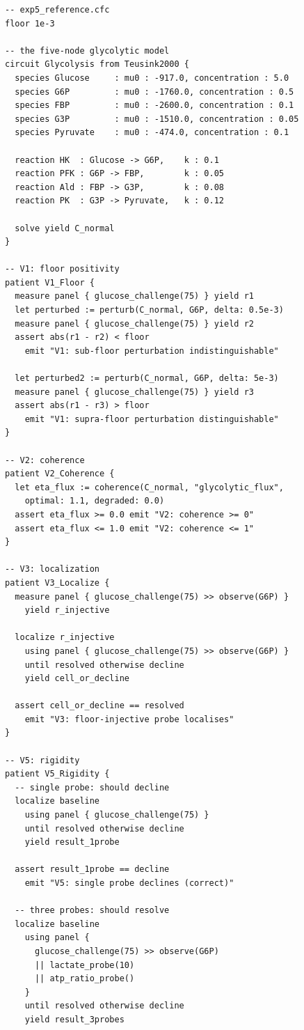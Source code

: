 \documentclass[11pt,a4paper]{article}
\theoremstyle{expthm}
\theoremstyle{definition}
\theoremstyle{remark}
\begin{document}
\begin{lstlisting}[caption={E5: CFC reference implementation.}]
-- exp5_reference.cfc
floor 1e-3

-- the five-node glycolytic model
circuit Glycolysis from Teusink2000 {
  species Glucose     : mu0 : -917.0, concentration : 5.0
  species G6P         : mu0 : -1760.0, concentration : 0.5
  species FBP         : mu0 : -2600.0, concentration : 0.1
  species G3P         : mu0 : -1510.0, concentration : 0.05
  species Pyruvate    : mu0 : -474.0, concentration : 0.1

  reaction HK  : Glucose -> G6P,    k : 0.1
  reaction PFK : G6P -> FBP,        k : 0.05
  reaction Ald : FBP -> G3P,        k : 0.08
  reaction PK  : G3P -> Pyruvate,   k : 0.12

  solve yield C_normal
}

-- V1: floor positivity
patient V1_Floor {
  measure panel { glucose_challenge(75) } yield r1
  let perturbed := perturb(C_normal, G6P, delta: 0.5e-3)
  measure panel { glucose_challenge(75) } yield r2
  assert abs(r1 - r2) < floor
    emit "V1: sub-floor perturbation indistinguishable"

  let perturbed2 := perturb(C_normal, G6P, delta: 5e-3)
  measure panel { glucose_challenge(75) } yield r3
  assert abs(r1 - r3) > floor
    emit "V1: supra-floor perturbation distinguishable"
}

-- V2: coherence
patient V2_Coherence {
  let eta_flux := coherence(C_normal, "glycolytic_flux",
    optimal: 1.1, degraded: 0.0)
  assert eta_flux >= 0.0 emit "V2: coherence >= 0"
  assert eta_flux <= 1.0 emit "V2: coherence <= 1"
}

-- V3: localization
patient V3_Localize {
  measure panel { glucose_challenge(75) >> observe(G6P) }
    yield r_injective

  localize r_injective
    using panel { glucose_challenge(75) >> observe(G6P) }
    until resolved otherwise decline
    yield cell_or_decline

  assert cell_or_decline == resolved
    emit "V3: floor-injective probe localises"
}

-- V5: rigidity
patient V5_Rigidity {
  -- single probe: should decline
  localize baseline
    using panel { glucose_challenge(75) }
    until resolved otherwise decline
    yield result_1probe

  assert result_1probe == decline
    emit "V5: single probe declines (correct)"

  -- three probes: should resolve
  localize baseline
    using panel {
      glucose_challenge(75) >> observe(G6P)
      || lactate_probe(10)
      || atp_ratio_probe()
    }
    until resolved otherwise decline
    yield result_3probes


\end{lstlisting}
\end{document}
